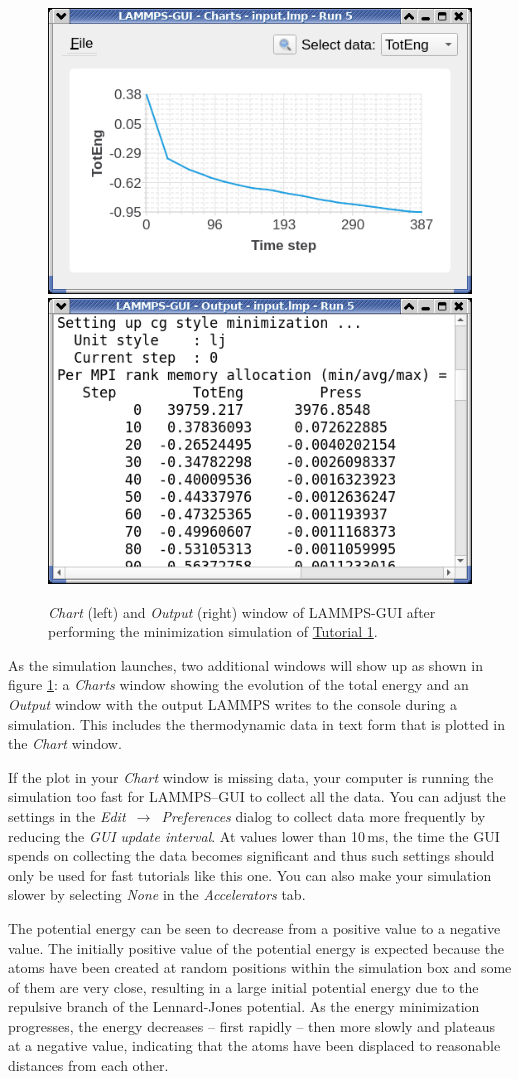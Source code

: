 \documentclass[9pt,tutorial]{livecoms}
\begin{document}
\begin{figure}
\centering
\includegraphics[width=0.45\linewidth]{chart-1}
\includegraphics[width=0.45\linewidth]{output-1}
\caption{\textit{Chart} (left) and \textit{Output} (right) window of LAMMPS-GUI after performing
  the minimization simulation of \hyperref[lennard-jones-label]{Tutorial 1}.}
\label{fig:chart-log}
\end{figure}

As the simulation launches, two additional windows will show up as shown
in figure \ref{fig:chart-log}: a \textit{Charts} window showing the
evolution of the total energy and an \textit{Output} window with the
output LAMMPS writes to the console during a simulation. This includes
the thermodynamic data in text form that is plotted in the \textit{Chart} window.

If the plot in your \textit{Chart} window is missing data, your
computer is running the simulation too fast for LAMMPS--GUI to collect
all the data.  You can adjust the settings in the
\textit{Edit~$\to$~Preferences} dialog to collect data more frequently
by reducing the \textit{GUI update interval}.  At values lower
than 10\,ms, the time the GUI spends on collecting the data becomes
significant and thus such settings should only be used for fast tutorials like
this one.  You can also make your simulation slower by selecting
\textit{None} in the \textit{Accelerators} tab.

The potential energy can be seen to decrease from a positive value to a
negative value.  The initially positive value of the potential energy is
expected because the atoms have been created at random positions within
the simulation box and some of them are very close, resulting in a large
initial potential energy due to the repulsive branch of the
Lennard-Jones potential.  As the energy minimization progresses, the
energy decreases -- first rapidly -- then more slowly and plateaus at
a negative value, indicating that the atoms have been displaced to
reasonable distances from each other.
\end{document}
